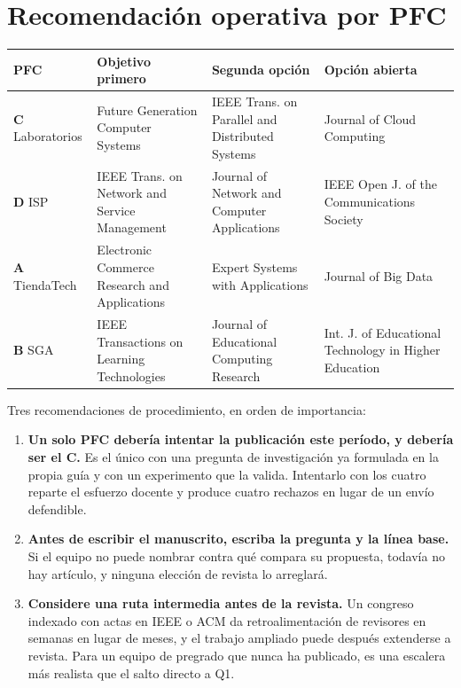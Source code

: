 \documentclass[11pt,a4paper]{article}
\begin{document}
\section{Recomendación operativa por PFC}
\label{sec:recomendacion}

\begin{center}
	\small
	\begin{tabular}{@{}p{2.0cm}p{5.4cm}p{4.0cm}p{3.4cm}@{}}
		\toprule
		\textbf{PFC} & \textbf{Objetivo primero} & \textbf{Segunda opción} & \textbf{Opción abierta} \\
		\midrule
		\textbf{C} Laboratorios & Future Generation Computer Systems & IEEE Trans. on Parallel and Distributed Systems & Journal of Cloud Computing \\
		\addlinespace
		\textbf{D} ISP & IEEE Trans. on Network and Service Management & Journal of Network and Computer Applications & IEEE Open J. of the Communications Society \\
		\addlinespace
		\textbf{A} TiendaTech & Electronic Commerce Research and Applications & Expert Systems with Applications & Journal of Big Data \\
		\addlinespace
		\textbf{B} SGA & IEEE Transactions on Learning Technologies & Journal of Educational Computing Research & Int. J. of Educational Technology in Higher Education \\
		\bottomrule
	\end{tabular}
\end{center}

Tres recomendaciones de procedimiento, en orden de importancia:

\begin{enumerate}[leftmargin=*,itemsep=5pt]
	\item \textbf{Un solo PFC debería intentar la publicación este período, y debería ser el C.} Es el único con una pregunta de investigación ya formulada en la propia guía y con un experimento que la valida. Intentarlo con los cuatro reparte el esfuerzo docente y produce cuatro rechazos en lugar de un envío defendible.
	\item \textbf{Antes de escribir el manuscrito, escriba la pregunta y la línea base.} Si el equipo no puede nombrar contra qué compara su propuesta, todavía no hay artículo, y ninguna elección de revista lo arreglará.
	\item \textbf{Considere una ruta intermedia antes de la revista.} Un congreso indexado con actas en IEEE o ACM da retroalimentación de revisores en semanas en lugar de meses, y el trabajo ampliado puede después extenderse a revista. Para un equipo de pregrado que nunca ha publicado, es una escalera más realista que el salto directo a Q1.
\end{enumerate}
\end{document}
